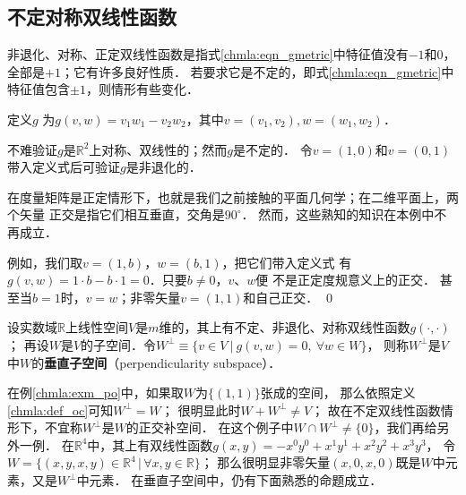 \subsection{不定对称双线性函数}\label{chmla:sec_indefbif}

非退化、对称、{\heiti 正定}双线性函数是指式\eqref{chmla:eqn_gmetric}中特征值没有$-1$和$0$，
全部是$+1$；它有许多良好性质．
若要求它是{\heiti 不定的}，即式\eqref{chmla:eqn_gmetric}中特征值包含$\pm 1$，则情形有些变化．

\begin{example}\label{chmla:exm_po}
    定义$g$ %
    为$g(v,w)=v_1 w_1 -v_2 w_2$，其中$v=(v_1,v_2), w=(w_1,w_2)$．
\end{example}

不难验证$g$是$\mathbb{R}^2$上对称、双线性的；然而$g$是不定的．
令$v=(1,0)$和$v=(0,1)$带入定义式后可验证$g$是非退化的．

在度量矩阵是正定情形下，也就是我们之前接触的平面几何学；在二维平面上，两个矢量
正交是指它们相互垂直，交角是$90^\circ$．
然而，这些熟知的知识在本例中不再成立．

例如，我们取$v=(1,b)$，$w=(b,1)$，把它们带入定义式
有$g(v,w)=1\cdot b- b\cdot 1 =0$．只要$b\neq 0$，$v$、$w$便
不是正定度规意义上的正交．
甚至当$b=1$时，$v=w$；非零矢量$v=(1,1)$和自己正交．
\qed

\begin{definition}\label{chmla:def_oc}
    设实数域$\mathbb{R}$上线性空间$V$是$m$维的，其上有不定、非退化、对称双线性函数$g(\cdot,\cdot)$；
    再设$W$是$V$的子空间．令$W^\perp \equiv \{v\in V \ |\ g(v,w)=0,\ \forall w\in W \}$，
    则称$W^\perp$是$V$中$W$的{\heiti \bfseries 垂直子空间}（perpendicularity subspace）．
\end{definition}


在例\ref{chmla:exm_po}中，如果取$W$为$\{(1,1)\}$张成的空间，
那么依照定义\eqref{chmla:def_oc}可知$W^\perp=W$；
很明显此时$W+W^\perp \neq V$；
故在不定双线性函数情形下，不宜称$W^\perp$是$W$的{\kaishu 正交补空间}．
在这个例子中$W\cap W^\perp \neq \{0\}$，我们再给另外一例．
在$\mathbb{R}^4$中，其上有双线性函数$g(x,y)=-x^0 y^0+x^1 y^1+x^2 y^2+x^3 y^3$，
令$W=\{(x,y,x,y)\in \mathbb{R}^4 \, |\, \forall x,y\in \mathbb{R}\}$；
那么很明显非零矢量$(x,0,x,0)$既是$W$中元素，又是$W^\perp$中元素．
在{\kaishu 垂直子空间}中，仍有下面熟悉的命题成立．

